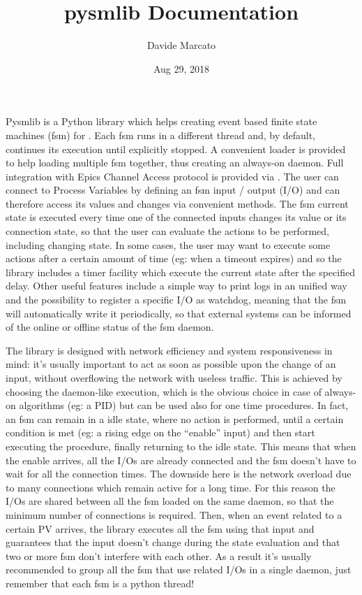 \documentclass[letterpaper,10pt,english]{sphinxmanual}
\title{pysmlib Documentation}
\date{Aug 29, 2018}
\author{Davide Marcato}
\begin{document}
\maketitle
\sphinxtableofcontents
{}\label{\detokenize{index::doc}}


Pysmlib is a Python library which helps creating event based finite state machines
(fsm) for . Each fsm
runs in a different thread and, by default, continues its execution until explicitly
stopped. A convenient loader is provided to help loading multiple fsm together,
thus creating an always-on daemon. Full integration with Epics Channel Access
protocol is provided via .
The user can connect to Process Variables by defining an fsm input / output (I/O)
and can therefore access its values and changes via convenient methods. The fsm
current state is executed every time one of the connected inputs changes its value
or its connection state, so that the user can evaluate the actions to be
performed, including changing state. In some cases, the user may want to execute
some actions after a certain amount of time (eg: when a timeout expires) and so
the library includes a timer facility which execute the current state after the
specified delay. Other useful features include a simple way to print logs in an
unified way and the possibility to register a specific I/O as watchdog, meaning
that the fsm will automatically write it periodically, so that external systems
can be informed of the online or offline status of the fsm daemon.

The library is designed with network efficiency and system responsiveness
in mind: it’s usually important to act as soon as possible upon the change of an
input, without overflowing the network with useless traffic. This is achieved
by choosing the daemon-like execution, which is the obvious choice in
case of always-on algorithms (eg: a PID) but can be used also for one time
procedures. In fact, an fsm can remain in a idle state, where no action is
performed, until a certain condition is met (eg: a rising edge on the “enable”
input) and then start executing the procedure, finally returning to the idle
state. This means that when the enable arrives, all the I/Os are already
connected and the fsm doesn’t have to wait for all the connection times. The
downside here is the network overload due to many connections which remain active
for a long time. For this reason the I/Os are shared between all the fsm loaded
on the same daemon, so that the minimum number of connections is required. Then,
when an event related to a certain PV arrives, the library executes all the fsm
using that input and guarantees that the input doesn’t change during the state
evaluation and that two or more fsm don’t interfere with each other. As a
result it’s usually recommended to group all the fsm that use related I/Os
in a single daemon, just remember that each fsm is a python thread!
\end{document}
